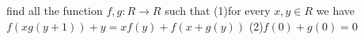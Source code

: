 find all the function $f,g:R\rightarrow R$ such that
(1)for every $x,y\in R$  we have  $f(xg(y+1))+y=xf(y)+f(x+g(y))$
(2)$f(0)+g(0)=0$